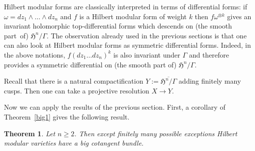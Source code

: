 \documentclass[JEP,XML,SOM,Unicode]{cedram}
\theoremstyle{plain}
\newtheorem{theorem}{Theorem}[section]
\theoremstyle{definition}
\numberwithin{equation}{theorem}
\newcommand\HH{\mathfrak H}
\begin{document}
Hilbert modular forms are classically interpreted in terms of differential forms: if~$\omega=dz_1\wedge \dots \wedge dz_n$ and $f$ is a Hilbert modular form of weight $k$ then $f\omega^{\otimes k}$ gives an invariant holomorphic top-differential forms which descends on (the smooth part~of) $\HH^n/\Gamma$. The observation already used in the previous sections is that one can also look at Hilbert modular forms as symmetric differential forms. Indeed, in the above notations, $f(dz_1\dots dz_n)^k$ is also invariant under $\Gamma$ and therefore provides a symmetric differential on (the smooth part of) $\HH^n/\Gamma$.

Recall that there is a natural compactification $Y:=\overline{\HH^n/\Gamma}$ adding finitely many cusps. Then one can take a projective resolution $X \to Y$.

Now we can apply the results of the previous section. First, a corollary of Theorem~\ref{big1} gives the following result.

\begin{theorem}\label{bigHMV}
Let $n \geq 2$. Then except finitely many possible exceptions Hilbert modular varieties have a big cotangent bundle.
\end{theorem}
\end{document}
